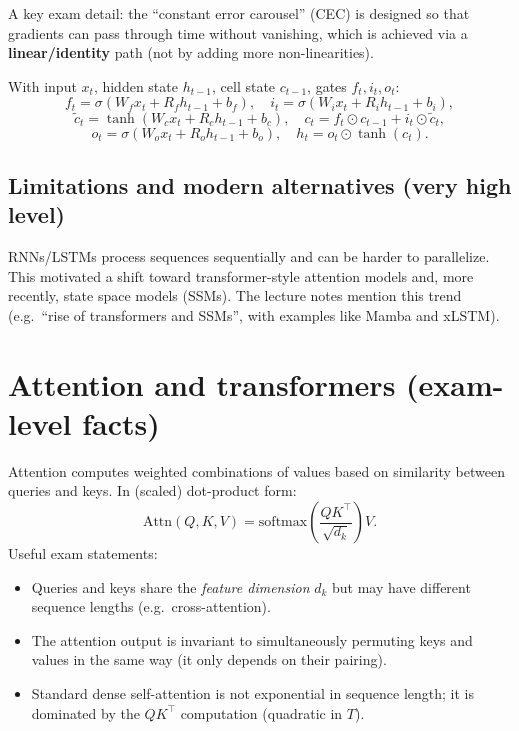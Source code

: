 \documentclass[11pt, oneside]{book}
\newcommand{\1}{\ind}                       %
\newcommand{\sigmoid}{\sigma}               %
\begin{document}
A key exam detail: the ``constant error carousel'' (CEC) is designed so that gradients can pass through time without vanishing, which is achieved via a \textbf{linear/identity} path (not by adding more non-linearities).

\begin{thmbox}[title={Standard LSTM Equations}]
With input $x_t$, hidden state $h_{t-1}$, cell state $c_{t-1}$, gates $f_t,i_t,o_t$:
\[
f_t=\sigmoid(W_f x_t + R_f h_{t-1}+b_f),\quad
i_t=\sigmoid(W_i x_t + R_i h_{t-1}+b_i),
\]
\[
\tilde c_t=\tanh(W_c x_t + R_c h_{t-1}+b_c),\quad
c_t=f_t\odot c_{t-1}+i_t\odot \tilde c_t,
\]
\[
o_t=\sigmoid(W_o x_t + R_o h_{t-1}+b_o),\quad
h_t=o_t\odot \tanh(c_t).
\]
\end{thmbox}

\subsection{Limitations and modern alternatives (very high level)}
RNNs/LSTMs process sequences sequentially and can be harder to parallelize. This motivated a shift toward transformer-style attention models and, more recently, state space models (SSMs). The lecture notes mention this trend (e.g.\ ``rise of transformers and SSMs'', with examples like Mamba and xLSTM).

\section{Attention and transformers (exam-level facts)}
Attention computes weighted combinations of values based on similarity between queries and keys. In (scaled) dot-product form:
\[
\mathrm{Attn}(Q,K,V)=\mathrm{softmax}\!\left(\frac{QK^\top}{\sqrt{d_k}}\right)V.
\]
Useful exam statements:
\begin{itemize}
  \item Queries and keys share the \emph{feature dimension} $d_k$ but may have different sequence lengths (e.g.\ cross-attention).
  \item The attention output is invariant to simultaneously permuting keys and values in the same way (it only depends on their pairing).
  \item Standard dense self-attention is not exponential in sequence length; it is dominated by the $QK^\top$ computation (quadratic in $T$).
\end{itemize}
\end{document}
